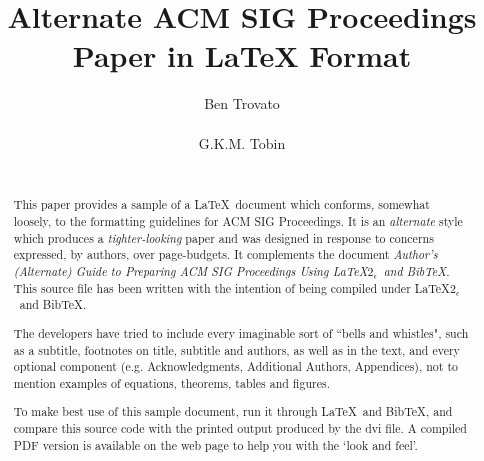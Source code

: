 \documentclass{sig-alternate-per}
\begin{document}
    \title{Alternate {\ttlit ACM} SIG Proceedings Paper in LaTeX
    Format}


    \author{
        \alignauthor
        Ben Trovato\\
        \\
        \alignauthor
        G.K.M. Tobin\\
        \\
    }

    \maketitle
    \begin{abstract}
        This paper provides a sample of a \LaTeX\ document which conforms,
        somewhat loosely, to the formatting guidelines for
        ACM SIG Proceedings.
        It is an {\em alternate} style which produces
        a {\em tighter-looking} paper and was designed in response to
        concerns expressed, by authors, over page-budgets.
        It complements the document \textit{Author's (Alternate) Guide to
        Preparing ACM SIG Proceedings Using \LaTeX$2_\epsilon$\ and Bib\TeX}.
        This source file has been written with the intention of being
        compiled under \LaTeX$2_\epsilon$\ and BibTeX.

        The developers have tried to include every imaginable sort
        of ``bells and whistles", such as a subtitle, footnotes on
        title, subtitle and authors, as well as in the text, and
        every optional component (e.g. Acknowledgments, Additional
        Authors, Appendices), not to mention examples of
        equations, theorems, tables and figures.

        To make best use of this sample document, run it through \LaTeX\
        and BibTeX, and compare this source code with the printed
        output produced by the dvi file.
        A compiled PDF version
        is available on the web page to help you with the
        `look and feel'.
    \end{abstract}
%    
\end{document}
